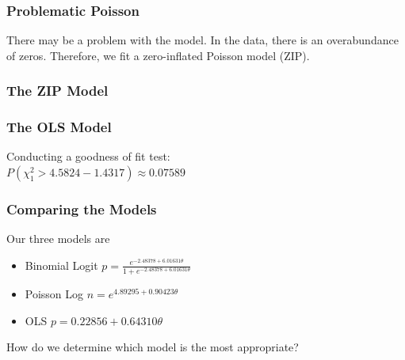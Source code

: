
\begin{frame}\frametitle{Problematic Poisson}
There may be a problem with the model.
In the data, there is an overabundance of zeros.
Therefore, we fit a zero-inflated Poisson model (ZIP).
{\fontsize{8}{3} \color{RBlue} }
\end{frame}

\begin{frame}\frametitle{The ZIP Model}
{\fontsize{8}{3} \color{RBlue} }
\end{frame}

\begin{frame}\frametitle{The OLS Model}
{\fontsize{8}{3} \color{RBlue} }

Conducting a goodness of fit test: \\
$P(\chi^{2}_{1}>4.5824-1.4317)\approx0.07589$\\

\end{frame}

\begin{frame}\frametitle{Comparing the Models}
Our three models are \\
\begin{itemize}
\item Binomial Logit $p=\frac{e^{-2.48378+6.01631\theta}}{1+e^{-2.48378+6.01631\theta}}$\\
\item Poisson Log $n=e^{4.89295+0.90423\theta}$\\
\item OLS $p=0.22856+0.64310\theta$\\
\end{itemize}
How do we determine which model is the most appropriate?\\
\end{frame}

